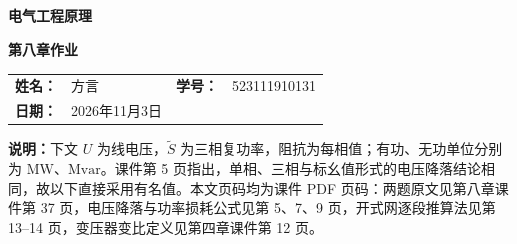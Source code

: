 \documentclass[
  lang = zh,
  final,
  oneside,
  openany,
  notitlepage,
  zihao = -4,
  linespread = 1.3,
  baselineskip = false,
  cjk-font = fandol,
  text-font = newtx,
  math-font = newtx
]{sjtureport}
\title{\course\ \assignment}
\author{\studentname}
\newcommand{\course}{电气工程原理}
\newcommand{\assignment}{第八章作业}
\newcommand{\studentname}{方言}
\newcommand{\studentid}{523111910131}
\newcommand{\duedate}{2026年11月3日}
\begin{document}
\begin{center}
    {\large\bfseries\course\par}
    \vspace{0.4em}
    {\Large\bfseries\assignment\par}
\end{center}

\vspace{0.6em}
{\large
    \noindent
    \begin{tabular}{@{}l@{\quad}l@{\qquad}l@{\quad}l@{}}
        \textbf{姓名：} & \studentname & \textbf{学号：} & \studentid \\[0.25em]
        \textbf{日期：} & \duedate
    \end{tabular}
    \par}
\vspace{0.4em}

\noindent
\textbf{说明：}下文 \(U\) 为线电压，\(\tilde S\) 为三相复功率，阻抗为每相值；有功、无功单位分别为 \(\mathrm{MW}\)、\(\mathrm{Mvar}\)。课件第 5 页指出，单相、三相与标幺值形式的电压降落结论相同，故以下直接采用有名值。本文页码均为课件 PDF 页码：两题原文见第八章课件第 37 页，电压降落与功率损耗公式见第 5、7、9 页，开式网逐段推算法见第 13--14 页，变压器变比定义见第四章课件第 12 页。


\end{document}

